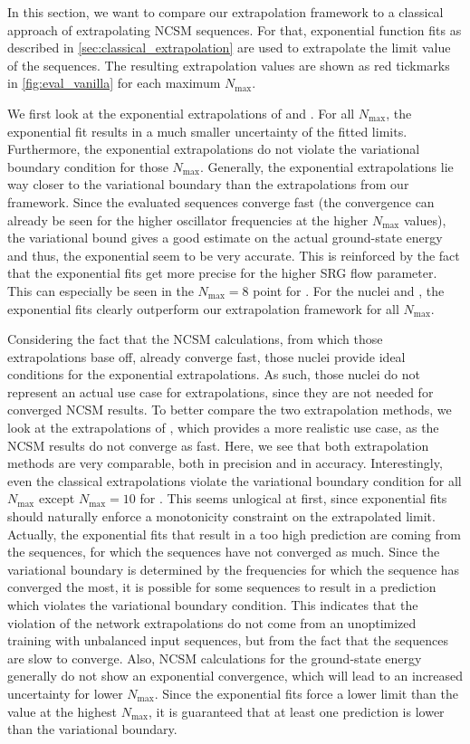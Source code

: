 In this section, we want to compare our extrapolation framework to a classical approach of extrapolating NCSM sequences. For that, exponential function fits as described in \autoref{sec:classical_extrapolation} are used to extrapolate the limit value of the sequences. The resulting extrapolation values are shown as red tickmarks in \autoref{fig:eval_vanilla} for each maximum $N_\mathrm{max}$.

We first look at the exponential extrapolations of  and . For all $N_\mathrm{max}$, the exponential fit results in a much smaller uncertainty of the fitted limits. Furthermore, the exponential extrapolations do not violate the variational boundary condition for those $N_\mathrm{max}$. Generally, the exponential extrapolations lie way closer to the variational boundary than the extrapolations from our framework. Since the evaluated sequences converge fast (the convergence can already be seen for the higher oscillator frequencies at the higher $N_\mathrm{max}$ values), the variational bound gives a good estimate on the actual ground-state energy and thus, the exponential seem to be very accurate. This is reinforced by the fact that the exponential fits get more precise for the higher SRG flow parameter. This can especially be seen in the $N_\mathrm{max}=8$ point for . For the nuclei  and , the exponential fits clearly outperform our extrapolation framework for all $N_\mathrm{max}$.

Considering the fact that the NCSM calculations, from which those extrapolations base off, already converge fast, those nuclei provide ideal conditions for the exponential extrapolations. As such, those nuclei do not represent an actual use case for extrapolations, since they are not needed for converged NCSM results. To better compare the two extrapolation methods, we look at the extrapolations of , which provides a more realistic use case, as the NCSM results do not converge as fast. Here, we see that both extrapolation methods are very comparable, both in precision and in accuracy. Interestingly, even the classical extrapolations violate the variational boundary condition for all $N_\mathrm{max}$ except $N_\mathrm{max} = 10$ for . This seems unlogical at first, since exponential fits should naturally enforce a monotonicity constraint on the extrapolated limit. Actually, the exponential fits that result in a too high prediction are coming from the sequences, for which the sequences have not converged as much. Since the variational boundary is determined by the frequencies for which the sequence has converged the most, it is possible for some sequences to result in a prediction which violates the variational boundary condition. This indicates that the violation of the network extrapolations do not come from an unoptimized training with unbalanced input sequences, but from the fact that the sequences are slow to converge. Also, NCSM calculations for the ground-state energy generally do not show an exponential convergence, which will lead to an increased uncertainty for lower $N_\mathrm{max}$. Since the exponential fits force a lower limit than the value at the highest $N_\mathrm{max}$, it is guaranteed that at least one prediction is lower than the variational boundary.

